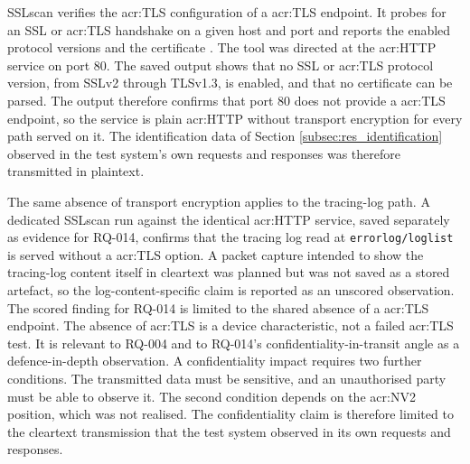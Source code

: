 SSLscan verifies the \gls{acr:TLS} configuration of a \gls{acr:TLS} endpoint. It probes for an SSL or \gls{acr:TLS} handshake on a given host and port and reports the enabled protocol versions and the certificate \Cite{rbsec-sslscan} \cite{kali_sslscan}. The tool was directed at the \gls{acr:HTTP} service on port 80. The saved output shows that no SSL or \gls{acr:TLS} protocol version, from SSLv2 through TLSv1.3, is enabled, and that no certificate can be parsed. The output therefore confirms that port 80 does not provide a \gls{acr:TLS} endpoint, so the service is plain \gls{acr:HTTP} without transport encryption for every path served on it. The identification data of Section \ref{subsec:res_identification} observed in the test system's own requests and responses was therefore transmitted in plaintext.

The same absence of transport encryption applies to the tracing-log path. A dedicated SSLscan run against the identical \gls{acr:HTTP} service, saved separately as evidence for RQ-014, confirms that the tracing log read at \texttt{errorlog/loglist} is served without a \gls{acr:TLS} option. A packet capture intended to show the tracing-log content itself in cleartext was planned but was not saved as a stored artefact, so the log-content-specific claim is reported as an unscored observation. The scored finding for RQ-014 is limited to the shared absence of a \gls{acr:TLS} endpoint.
The absence of \gls{acr:TLS} is a device characteristic, not a failed \gls{acr:TLS} test. It is relevant to RQ-004 and to RQ-014's confidentiality-in-transit angle as a defence-in-depth observation.
A confidentiality impact requires two further conditions. The transmitted data must be sensitive, and an unauthorised party must be able to observe it. The second condition depends on the \gls{acr:NV2} position, which was not realised. The confidentiality claim is therefore limited to the cleartext transmission that the test system observed in its own requests and responses.








